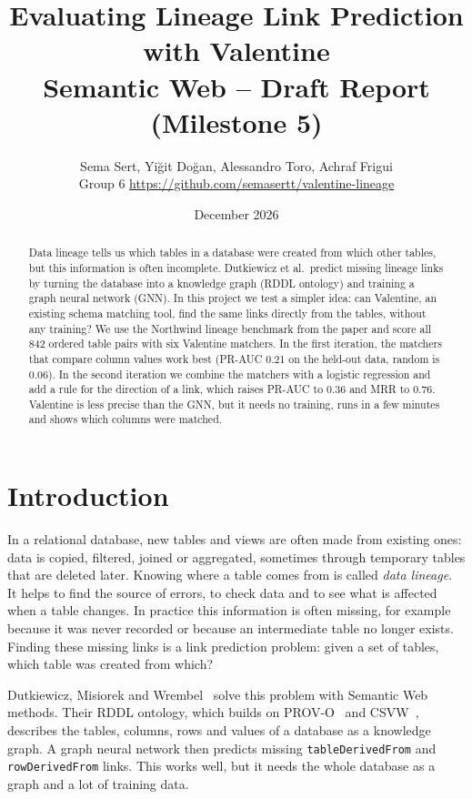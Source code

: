 \documentclass[11pt,a4paper]{article}
\title{Evaluating Lineage Link Prediction with Valentine\\[4pt]
\large Semantic Web -- Draft Report (Milestone 5)}
\author{Sema Sert, Yi\u{g}it Do\u{g}an, Alessandro Toro, Achraf Frigui\\[2pt]
\small Group 6 \quad\textbullet\quad \url{https://github.com/semasertt/valentine-lineage}}
\date{December 2026}
\begin{document}
\maketitle

\begin{abstract}
\noindent Data lineage tells us which tables in a database were created from which other tables, but this
information is often incomplete. Dutkiewicz et al.\ predict missing lineage links by turning the database into a
knowledge graph (RDDL ontology) and training a graph neural network (GNN). In this project we test a simpler idea:
can Valentine, an existing schema matching tool, find the same links directly from the tables, without any
training? We use the Northwind lineage benchmark from the paper and score all 842 ordered table pairs with six
Valentine matchers. In the first iteration, the matchers that compare column values work best (PR-AUC 0.21 on the
held-out data, random is 0.06). In the second iteration we combine the matchers with a logistic regression and add
a rule for the direction of a link, which raises PR-AUC to 0.36 and MRR to 0.76. Valentine is less precise than
the GNN, but it needs no training, runs in a few minutes and shows which columns were matched.
\end{abstract}

\section{Introduction}

In a relational database, new tables and views are often made from existing ones: data is copied, filtered,
joined or aggregated, sometimes through temporary tables that are deleted later. Knowing where a table comes from
is called \emph{data lineage}. It helps to find the source of errors, to check data and to see what is affected
when a table changes. In practice this information is often missing, for example because it was never recorded
or because an intermediate table no longer exists. Finding these missing links is a link prediction problem:
given a set of tables, which table was created from which?

Dutkiewicz, Misiorek and Wrembel~\cite{dutkiewicz2026rddl,dutkiewicz2026kg} solve this problem with Semantic Web
methods. Their RDDL ontology, which builds on PROV-O~\cite{lebo2013provo} and CSVW~\cite{tennison2015csvw},
describes the tables, columns, rows and values of a database as a knowledge graph. A graph neural network then
predicts missing \texttt{tableDerivedFrom} and \texttt{rowDerivedFrom} links. This works well, but it needs the
whole database as a graph and a lot of training data.
\end{document}
